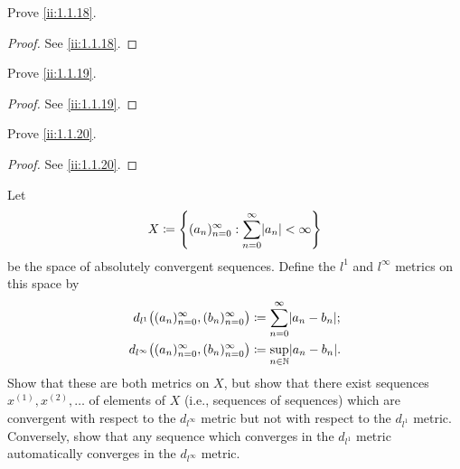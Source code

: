 \begin{ex}\label{ii:ex:1.1.12}
  Prove \cref{ii:1.1.18}.
\end{ex}

\begin{proof}
  See \cref{ii:1.1.18}.
\end{proof}

\begin{ex}\label{ii:ex:1.1.13}
  Prove \cref{ii:1.1.19}.
\end{ex}

\begin{proof}
  See \cref{ii:1.1.19}.
\end{proof}

\begin{ex}\label{ii:ex:1.1.14}
  Prove \cref{ii:1.1.20}.
\end{ex}

\begin{proof}
  See \cref{ii:1.1.20}.
\end{proof}

\begin{ex}\label{ii:ex:1.1.15}
  Let
  \[
    X \coloneqq \set{(a_n)_{n = 0}^\infty : \sum_{n = 0}^\infty \abs{a_n} < \infty}
  \]
  be the space of absolutely convergent sequences. Define the \(l^1\) and \(l^\infty\) metrics
  on this space by
  \begin{align*}
    d_{l^1}\big((a_n)_{n = 0}^\infty, (b_n)_{n = 0}^\infty\big)      & \coloneqq \sum_{n = 0}^\infty \abs{a_n - b_n}; \\
    d_{l^\infty}\big((a_n)_{n = 0}^\infty, (b_n)_{n = 0}^\infty\big) & \coloneqq \sup_{n \in \N} \abs{a_n - b_n}.
  \end{align*}
  Show that these are both metrics on \(X\), but show that there exist sequences \(x^{(1)}, x^{(2)}, \dots\) of elements of \(X\) (i.e., sequences of sequences) which are convergent with respect to the \(d_{l^\infty}\) metric but not with respect to the \(d_{l^1}\) metric.
  Conversely, show that any sequence which converges in the \(d_{l^1}\) metric automatically converges in the \(d_{l^\infty}\) metric.
\end{ex}

